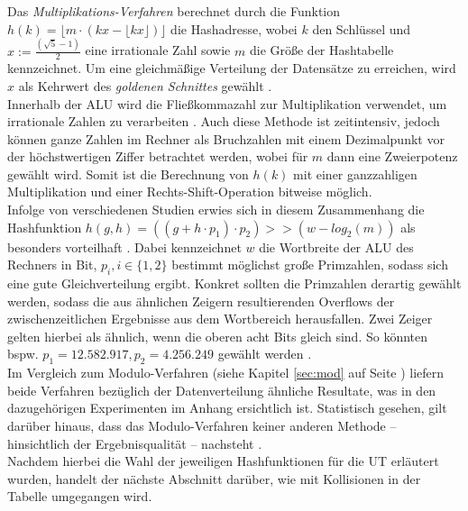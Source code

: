 \label{sec:mul}
Das \emph{Multiplikations-Verfahren} berechnet durch die Funktion $h(k) = \lfloor m \cdot (kx- \lfloor kx \rfloor) \rfloor$ die Hashadresse, wobei $k$ den Schlüssel und $x :=   \frac{(\sqrt{5}-1)}{2}$ eine irrationale Zahl sowie $m$ die Größe der Hashtabelle kennzeichnet. Um eine gleichmäßige Verteilung der Datensätze zu erreichen, wird $x$ als Kehrwert des \emph{goldenen Schnittes} gewählt \cite{ow1990}.\\
Innerhalb der ALU wird die Fließkommazahl zur Multiplikation verwendet, um irrationale Zahlen zu verarbeiten \cite[S.74]{h2002}. Auch diese Methode ist zeitintensiv, jedoch können ganze Zahlen im Rechner als Bruchzahlen mit einem Dezimalpunkt vor der höchstwertigen Ziffer betrachtet werden, wobei für $m$ dann eine Zweierpotenz gewählt wird. Somit ist die Berechnung von $h(k)$ mit einer ganzzahligen Multiplikation und einer Rechts-Shift-Operation bitweise möglich.\\
Infolge von verschiedenen Studien erwies sich in diesem Zusammenhang die Hashfunktion $h(g, h) = ((g + h \cdot p_1) \cdot p_2) >> (w - log_2(m))$ als besonders vorteilhaft \cite{ybobcjrs1998}. Dabei kennzeichnet $w$ die Wortbreite der ALU des Rechners in Bit, $p_i, i \in \{ 1, 2 \}$ bestimmt möglichst große Primzahlen, sodass sich eine gute Gleichverteilung ergibt. Konkret sollten die Primzahlen derartig gewählt werden, sodass die aus ähnlichen Zeigern resultierenden Overflows der zwischenzeitlichen Ergebnisse aus dem Wortbereich herausfallen. Zwei Zeiger gelten hierbei als ähnlich, wenn die oberen acht Bits gleich sind. So könnten bspw. $p_1 = 12.582.917, p_2=4.256.249$ gewählt werden \cite[S.74-75]{h2002}.\\
Im Vergleich zum Modulo-Verfahren (siehe Kapitel \ref{sec:mod} auf Seite \pageref{sec:mod}) liefern beide Verfahren bezüglich der Datenverteilung ähnliche Resultate, was in den dazugehörigen Experimenten im Anhang ersichtlich ist. Statistisch gesehen, gilt darüber hinaus, dass das Modulo-Verfahren keiner anderen Methode -- hinsichtlich der Ergebnisqualität -- nachsteht \cite{lyd1971}.\\
Nachdem hierbei die Wahl der jeweiligen Hashfunktionen für die UT erläutert wurden, handelt der nächste Abschnitt darüber, wie mit Kollisionen in der Tabelle umgegangen wird.

